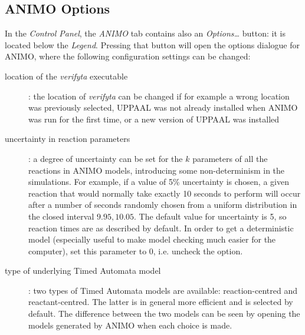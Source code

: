 \documentclass{article}
\begin{document}
\subsection{ANIMO Options}\label{sec:animo-options}
In the \emph{Control Panel}, the \emph{ANIMO} tab contains also an \emph{Options\dots} button:
it is located below the \emph{Legend}. Pressing that button will open the options dialogue for
ANIMO, where the following configuration settings can be changed:
\begin{description}
  \item[location of the \emph{verifyta} executable]: the location of \emph{verifyta}
    can be changed if for example a wrong location was previously selected,
    UPPAAL was not already installed when ANIMO was run for the first time, or a new
    version of UPPAAL was installed
  \item[uncertainty in reaction parameters]: a degree of uncertainty can be set for the
    $k$ parameters of all the reactions in ANIMO models, introducing some non-determinism
    in the simulations. For example, if a value of 5\% uncertainty is chosen, a given reaction
    that would normally take exactly 10 seconds to perform will occur after a number of
    seconds randomly chosen from a uniform distribution in the closed interval $9.95, 10.05$.
    The default value for uncertainty is 5, so reaction times are as described by default.
    In order to get a deterministic model (especially useful to make model checking much
    easier for the computer), set this parameter to 0, i.e. uncheck the option.
  \item[type of underlying Timed Automata model]: two types of Timed Automata models are
    available: reaction-centred and reactant-centred. The latter is in general more efficient
    and is selected by default. The difference between the two models can be seen by opening
    the models generated by ANIMO when each choice is made.
\end{description}
\end{document}
